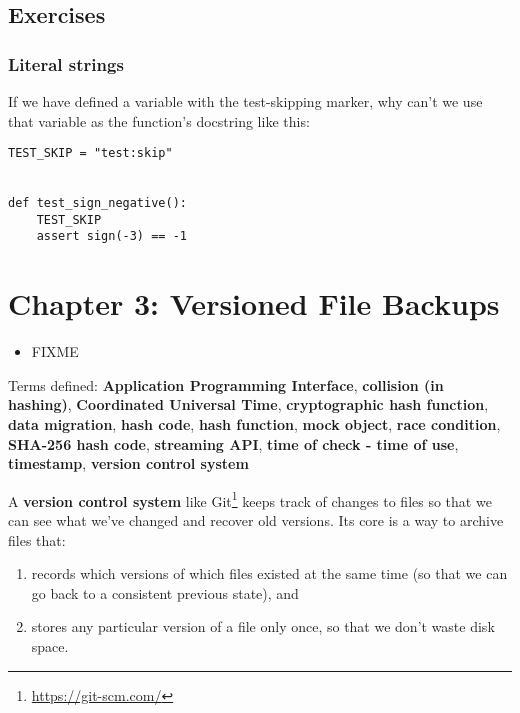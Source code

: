 \documentclass{scrbook}
\newcommand{\glossref}[1]{\textbf{#1}}
\newcommand{\hreffoot}[2]{{#1}\footnote{\href{#2}{#2}}}
\begin{document}
\section{Exercises}\label{tester-exercises}

\subsection*{Literal strings}


If we have defined a variable with the test-skipping marker,
why can't we use that variable as the function's docstring like this:

\begin{lstlisting}[frame=single,frameround=tttt]
TEST_SKIP = "test:skip"


def test_sign_negative():
    TEST_SKIP
    assert sign(-3) == -1
\end{lstlisting}

\chapter{Chapter 3: Versioned File Backups}\label{backup}

\begin{itemize}

\item FIXME

\end{itemize}


\noindent 
    Terms defined:
    \glossref{Application Programming Interface}, \glossref{collision (in hashing)}, \glossref{Coordinated Universal Time}, \glossref{cryptographic hash function}, \glossref{data migration}, \glossref{hash code}, \glossref{hash function}, \glossref{mock object}, \glossref{race condition}, \glossref{SHA-256 hash code}, \glossref{streaming API}, \glossref{time of check - time of use}, \glossref{timestamp}, \glossref{version control system}



A \glossref{version control system}
like \hreffoot{Git}{https://git-scm.com/}
keeps track of changes to files
so that we can see what we've changed and recover old versions.
Its core is a way to archive files that:

\begin{enumerate}

\item records which versions of which files existed at the same time
    (so that we can go back to a consistent previous state), and

\item stores any particular version of a file only once,
    so that we don't waste disk space.

\end{enumerate}
\end{document}
